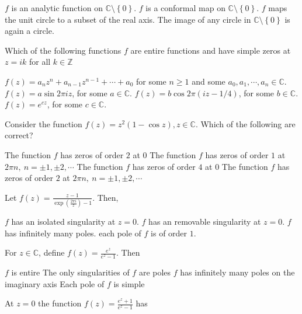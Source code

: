 \documentclass[10pt]{exam}
\newcommand{\C}{\ensuremath{\mathbb{C}}}
\newcommand{\Z}{\ensuremath{\mathbb{Z}}}
\newcommand{\set}[1]{\ensuremath{\left \{ {#1} \right \}}}
\newcommand{\smallb}[1]{\ensuremath{\left ( {#1} \right )}}
\begin{document}
\begin{questions}
\begin{checkboxes}
\choice $f$ is an analytic function on $\C \setminus \set{0}$.
\choice $f$ is a conformal map  on $\C \setminus \set{0}$.
\choice $f$ maps the unit circle to a subset of the real axis.
\choice The image of any circle in  $\C \setminus \set{0}$ is again a circle.
\end{checkboxes}
\question 
Which of the following functions $f$ are entire functions and have simple zeros at $z = ik$ for all $k \in \Z$

\begin{checkboxes}
\choice $f(z) = a_nz^n + a_{n-1}z^{n-1} + \cdots + a_0$ for some $n\geq 1$ and some $a_0, a_1, \cdots ,a_n \in \C$.
\choice $f(z) = a \sin 2\pi i z$, for some $a \in \C$.
\choice $f(z) = b \cos 2\pi (i z - 1/4)$, for some $b \in \C$.
\choice $f(z) = e^{cz}$, for some $c \in \C$.
\end{checkboxes}


\question 
Consider the function $f(z) = z^2 (1- \cos z), z \in \C$. Which of the following are correct?

\begin{checkboxes}
\choice The function $f$ has zeros of order $2$ at $0$ 
\choice The function $f$ has zeros of order $1$ at $2 \pi n,~ n = \pm 1, \pm 2, \cdots $ 
\choice The function $f$ has zeros of order $4$ at $0$ 
\choice The function $f$ has zeros of order $2$ at $2 \pi n,~ n = \pm 1, \pm 2, \cdots $ 
\end{checkboxes}

\question 
Let $f(z) = \frac{z-1}{\exp \smallb{\frac{2 \pi i}{z}} - 1}$. Then, 

\begin{checkboxes}
\choice $f$ has an isolated singularity at $z = 0$. 
\choice $f$ has an removable singularity at $z = 0$. 
\choice $f$ has infinitely many poles. 
\choice each pole of $f$ is of order $1$.
\end{checkboxes} 

\question 
For $z \in \C$, define $f(z) = \frac{e^z}{e^z - 1} $. Then  

\begin{checkboxes}
\choice $f$ is entire 
\choice The only singularities of $f$ are poles 
\choice $f$ has infinitely many poles on the imaginary axis 
\choice Each pole of $f$ is simple 
\end{checkboxes}


\question 
At $z= 0$ the function $f(z) = \frac{e^z + 1}{e^z - 1 }$ has 


\end{questions}
\end{document}
